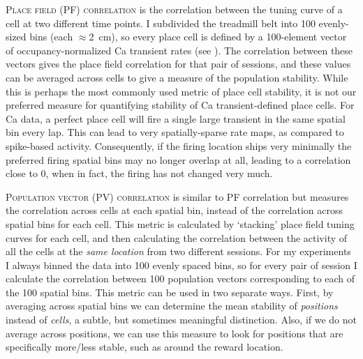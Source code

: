 \textsc{Place field (PF) correlation} is the correlation between the tuning curve of a cell at two different time points. I subdivided the treadmill belt into 100 evenly-sized bins (each $\approx$2~cm), so every place cell is defined by a 100-element vector of occupancy-normalized Ca transient rates (see ). The correlation between these vectors gives the place field correlation for that pair of sessions, and these values can be averaged across cells to give a measure of the population stability.
While this is perhaps the most commonly used metric of place cell stability, it is not our preferred measure for quantifying stability of Ca transient-defined place cells.
For Ca data, a perfect place cell will fire a single large transient in the same spatial bin every lap.
This can lead to very spatially-sparse rate maps, as compared to spike-based activity.
Consequently, if the firing location ships very minimally the preferred firing spatial bins may no longer overlap at all, leading to a correlation close to 0, when in fact, the firing has not changed very much.

\textsc{Population vector (PV) correlation} is similar to PF correlation but measures the correlation across cells at each spatial bin, instead of the correlation across spatial bins for each cell.
This metric is calculated by `stacking' place field tuning curves for each cell, and then calculating the correlation between the activity of all the cells at the \textit{same location} from two different sessions.
For my experiments I always binned the data into 100 evenly spaced bins, so for every pair of session I calculate the correlation between 100 population vectors corresponding to each of the 100 spatial bins.
This metric can be used in two separate ways.
First, by averaging across spatial bins we can determine the mean stability of \textit{positions} instead of \textit{cells}, a subtle, but sometimes meaningful distinction.
Also, if we do not average across positions, we can use this measure to look for positions that are specifically more/less stable, such as around the reward location.

